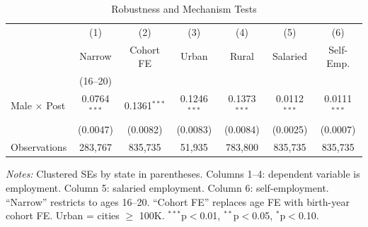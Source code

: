 \begin{table}[t]
\centering
\caption{Robustness and Mechanism Tests}
\label{tab:robustness}
\small
\begin{tabular}{lcccccc}
\toprule
 & (1) & (2) & (3) & (4) & (5) & (6) \\
 & Narrow & Cohort FE & Urban & Rural & Salaried & Self-Emp. \\
 & (16--20) & & & & & \\
\midrule
Male $\times$ Post & 0.0764$^{***}$ & 0.1361$^{***}$ & 0.1246$^{***}$ & 0.1373$^{***}$ & 0.0112$^{***}$ & 0.0111$^{***}$ \\
 & (0.0047) & (0.0082) & (0.0083) & (0.0084) & (0.0025) & (0.0007) \\
\midrule
Observations & 283,767 & 835,735 & 51,935 & 783,800 & 835,735 & 835,735 \\
\bottomrule
\end{tabular}
\begin{tablenotes}
\footnotesize
\item \textit{Notes:} Clustered SEs by state in parentheses. Columns 1--4: dependent variable is employment. Column 5: salaried employment. Column 6: self-employment. ``Narrow'' restricts to ages 16--20. ``Cohort FE'' replaces age FE with birth-year cohort FE. Urban = cities $\geq$ 100K. $^{***}$p$<$0.01, $^{**}$p$<$0.05, $^{*}$p$<$0.10.
\end{tablenotes}
\end{table}
